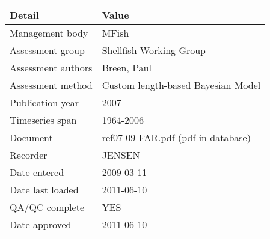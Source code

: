 \begin{table}[htb]
\centering
\begin{tabular}{lp{7cm}}
\toprule
Detail & Value \\
\midrule
Management body    & MFish                              \\
Assessment group   & Shellfish Working Group            \\
Assessment authors & Breen, Paul                        \\
Assessment method  & Custom length-based Bayesian Model \\
Publication year   & 2007                               \\
Timeseries span    & 1964-2006                          \\
Document           & ref07-09-FAR.pdf (pdf in database) \\
Recorder           & JENSEN                             \\
Date entered       & 2009-03-11                         \\
Date last loaded   & 2011-06-10                         \\
QA/QC complete     & YES                                \\
Date approved      & 2011-06-10                         \\
\bottomrule
\end{tabular}
\label{tab:assessdet}
\end{table}
